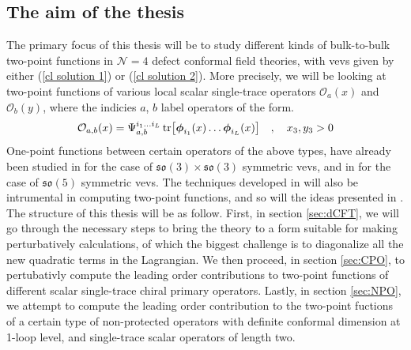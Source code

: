 \subsection{The aim of the thesis}
The primary focus of this thesis will be to study different kinds of bulk-to-bulk two-point functions in $\mathcal{N} = 4$ defect conformal field theories, with vevs given by either (\ref{cl solution 1}) or (\ref{cl solution 2}). More precisely, we will be looking at two-point functions of various local scalar single-trace operators $\mathcal{O}_a(x)$ and $\mathcal{O}_b(y)$, where the indicies $a$, $b$ label operators of the form.
%
%
\begin{equation}
\mathcal{O}_{a,b}(x) = \Psi_{a,b}^{i_1 \ldots i_L} \tr[\boldsymbol{\phi}_{i_1}(x) \ldots \boldsymbol{\phi}_{i_L}(x)]
%
\quad , \quad
%
x_3,y_3 > 0
\end{equation}
%
%
One-point functions between certain operators of the above types, have already been studied in \cite{One-point functions in D3-D7} for the case of $\mathfrak{so}(3) \times \mathfrak{so}(3)$ symmetric vevs, and in \cite{One-point functions in D3-D7 SO(5)} for the case of $\mathfrak{so}(5)$ symmetric vevs. The techniques developed in \cite{One-point functions in D3-D7,One-point functions in D3-D7 SO(5)} will also be intrumental in computing two-point functions, and so will the ideas presented in \cite{Length L length 2 two-point functions D5-D3}. The structure of this thesis will be as follow. First, in section \ref{sec:dCFT}, we will go through the necessary steps to bring the theory to a form suitable for making perturbatively calculations, of which the biggest challenge is to diagonalize all the new quadratic terms in the Lagrangian. We then proceed, in section \ref{sec:CPO}, to pertubativly compute the leading order contributions to two-point functions of different scalar single-trace chiral primary operators. Lastly, in section \ref{sec:NPO}, we attempt to compute the leading order contribution to the two-point fuctions of a certain type of non-protected operators with definite conformal dimension at 1-loop level, and single-trace scalar operators of length two.

